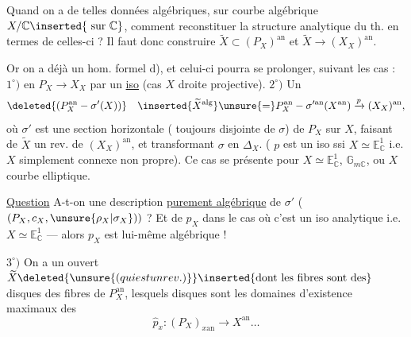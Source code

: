 Quand on a de telles données algébriques, sur courbe algébrique $X/\mathbb C\inserted{\text{ sur }\mathbb C}$, comment reconstituer la structure analytique du th. en termes de celles-ci ? Il faut donc construire  $\widetilde X\subset(P_X)^{\mathrm{an}}$ et $\widetilde X\longrightarrow(X_X)^{\mathrm{an}}$.

Or on a déjà un hom. formel d), et celui-ci pourra se prolonger, suivant les cas : $1^\circ)$ en $P_X\longrightarrow X_X$ par un \uline{iso} (cas $X$ droite projective). $2^\circ)$ Un 
\[
\deleted{(P_X^{\mathrm{an}}-\sigma'(X))}\quad
\inserted{\widetilde X^{\mathrm{alg}}}\unsure{=}
P_X^{\mathrm{an}}-\sigma'^{\mathrm{an}}(X^{\mathrm{an}})\xrightarrow{p}(X_X)^{\mathrm{an}},
\]
où $\sigma'$ est une section horizontale ( toujours disjointe de $\sigma$) de $P_X$ sur $X$, faisant de $\widetilde X$ un rev. de $(X_X)^{\mathrm{an}}$, et transformant $\sigma$ en $\Delta_X$. ( $p$ est un iso ssi $X\simeq \mathbb E^1_{\mathbb C}$ i.e. $X$ simplement connexe non propre). Ce cas se présente pour $X\simeq \mathbb E^1_{\mathbb C}$, $\mathbb G_{m\mathbb C}$, ou $X$ courbe elliptique.


\uline{Question} A-t-on une description \uline{purement algébrique} de $\sigma'$ ( $(P_X,c_X,\unsure{\rho_X|\sigma_X}))$ ? Et de $p_X$ dans le cas où c'est un iso analytique i.e. $X\simeq \mathbb E^1_{\mathbb C}$ --- alors $p_X$ est lui-même algébrique !


$3^\circ)$ On a un ouvert $\widetilde X\deleted{\unsure{(qui est un rev.)}}\inserted{\text{dont les fibres sont des}}$ disques des fibres de $P_X^{\mathrm{an}}$, lesquels disques sont les domaines d'existence maximaux des
\[\widehat p_x:(P_X)_{x\mathrm{an}}\longrightarrow X^{\mathrm{an}}\ldots\]
